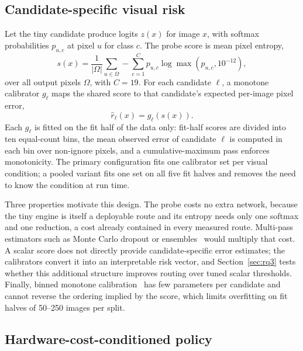 \documentclass[a4paper,5p]{elsarticle}
\begin{document}
\subsection{Candidate-specific visual risk}
\label{sec:calibration}

Let the tiny candidate produce logits $z(x)$ for image $x$, with softmax probabilities $p_{u,c}$ at pixel $u$ for class $c$. The probe score is mean pixel entropy,
\begin{equation}
s(x)=\frac{1}{|\Omega|}\sum_{u\in\Omega}-\sum_{c=1}^{C}p_{u,c}\log\max(p_{u,c},10^{-12}),
\label{eq:entropy}
\end{equation}
over all output pixels $\Omega$, with $C=19$. For each candidate $\ell$, a monotone calibrator $g_\ell$ maps the shared score to that candidate's expected per-image pixel error,
\begin{equation}
\widehat{r}_\ell(x)=g_\ell(s(x)).
\label{eq:risk}
\end{equation}
Each $g_\ell$ is fitted on the fit half of the data only: fit-half scores are divided into ten equal-count bins, the mean observed error of candidate $\ell$ is computed in each bin over non-ignore pixels, and a cumulative-maximum pass enforces monotonicity. The primary configuration fits one calibrator set per visual condition; a pooled variant fits one set on all five fit halves and removes the need to know the condition at run time.

Three properties motivate this design. The probe costs no extra network, because the tiny engine is itself a deployable route and its entropy needs only one softmax and one reduction, a cost already contained in every measured route. Multi-pass estimators such as Monte Carlo dropout or ensembles~\cite{gal2016dropout,lakshminarayanan2017ensembles} would multiply that cost. A scalar score does not directly provide candidate-specific error estimates; the calibrators convert it into an interpretable risk vector, and Section~\ref{sec:rq3} tests whether this additional structure improves routing over tuned scalar thresholds. Finally, binned monotone calibration~\cite{zadrozny2002isotonic} has few parameters per candidate and cannot reverse the ordering implied by the score, which limits overfitting on fit halves of 50--250 images per split.

\subsection{Hardware-cost-conditioned policy}
\label{sec:policy}
\end{document}

